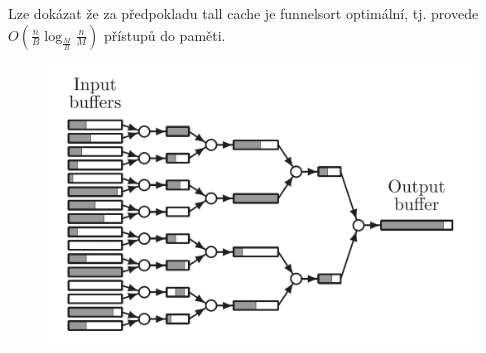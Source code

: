 \documentclass[11pt]{report} %
\numberwithin{equation}{section}
\begin{document}
\begin{itemize}
		Lze dokázat že za předpokladu tall cache je funnelsort optimální, tj. provede $O(\frac{n}{B}\log_{\frac{M}{B}}\frac{n}{M})$ přístupů do paměti.
		\begin{figure}[H]
			\label{merger}
			\centering
			\includegraphics[]{img/kmerger.png}
		\end{figure}
\end{itemize}
\end{document}

